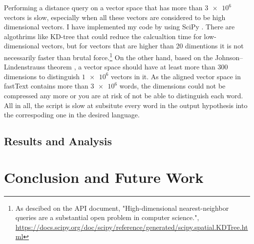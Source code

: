 \documentclass[thesis,fonts=libertine]{cluu}
\begin{document}
Performing a distance query on a vector space that has more than $\num{3e6}$ vectors is slow, especially when all these vectors are considered to be high dimensional vectors.  I have implemented my code by using SciPy \parencite{Virtanen:2019aa}. There are algothrims like KD-tree \parencite{Maneewongvatana:aa} that could reduce the calcualtion time for low-dimensional vectors, but for vectors that are higher than 20 dimentions it is not necessarily faster than brutal force.\footnote{As descibed on the API document, "High-dimensional nearest-neighbor queries are a substantial open problem in computer science.", \url{https://docs.scipy.org/doc/scipy/reference/generated/scipy.spatial.KDTree.html}} On the other hand, based on the Johnson–Lindenstrauss theorem \parencite{johnson1984extensions}, a vector space should have at least more than 300 dimensions to distinguish $\num{1e6}$ vectors in it. As the aligned vector space in fastText contains more than $\num{3e6}$ words, the dimensions could not be compressed any more or you are at risk of not be able to distinguish each word. All in all, the script is slow at subsitute every word in the output hypothesis into the correspoding one in the desired language.

\section{Results and Analysis}

\chapter{Conclusion and Future Work}
\label{chap:conclusion}

\printbibliography
\end{document}

